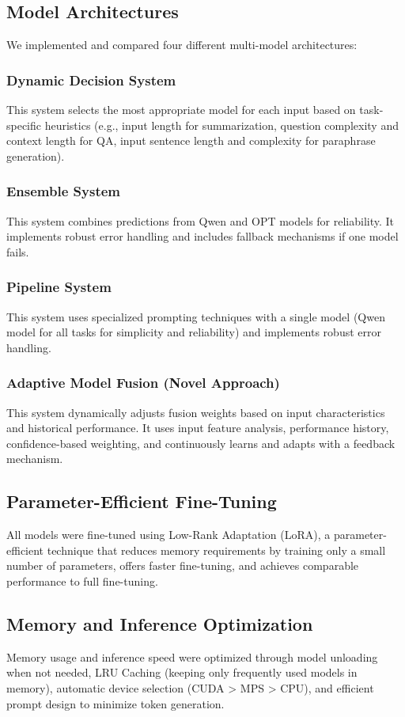 \documentclass[10pt,twocolumn,letterpaper]{article}
\begin{document}
\subsection{Model Architectures}
We implemented and compared four different multi-model architectures:

\subsubsection{Dynamic Decision System}
This system selects the most appropriate model for each input based on task-specific heuristics (e.g., input length for summarization, question complexity and context length for QA, input sentence length and complexity for paraphrase generation).

\subsubsection{Ensemble System}
This system combines predictions from Qwen and OPT models for reliability. It implements robust error handling and includes fallback mechanisms if one model fails.

\subsubsection{Pipeline System}
This system uses specialized prompting techniques with a single model (Qwen model for all tasks for simplicity and reliability) and implements robust error handling.

\subsubsection{Adaptive Model Fusion (Novel Approach)}
This system dynamically adjusts fusion weights based on input characteristics and historical performance. It uses input feature analysis, performance history, confidence-based weighting, and continuously learns and adapts with a feedback mechanism.

\subsection{Parameter-Efficient Fine-Tuning}
All models were fine-tuned using Low-Rank Adaptation (LoRA), a parameter-efficient technique that reduces memory requirements by training only a small number of parameters, offers faster fine-tuning, and achieves comparable performance to full fine-tuning.

\subsection{Memory and Inference Optimization}
Memory usage and inference speed were optimized through model unloading when not needed, LRU Caching (keeping only frequently used models in memory), automatic device selection (CUDA > MPS > CPU), and efficient prompt design to minimize token generation.
\end{document}
